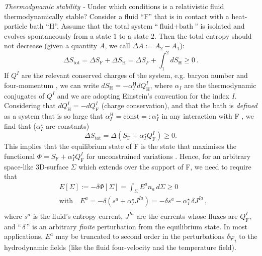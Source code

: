 \documentclass[aps,prl,reprint,nofootinbib]{revtex4-1}
\begin{document}
\textit{Thermodynamic stability -} Under which conditions is a relativistic fluid thermodynamically stable? Consider a fluid ``F'' that is in contact with a heat-particle bath ``H''. Assume that the total system ``$\text{fluid}+\text{bath}$'' is isolated and evolves spontaneously from a state $1$ to a state $2$. Then the total entropy should not decrease (given a quantity $A$, we call $\Delta A:= A_2-A_1$):
\begin{equation}
\Delta S_{\text{tot}}=\Delta S_\text{F} + \Delta S_\text{H} = \Delta S_F + \int_1^2 dS_\text{H}  \geq 0 \, .
\end{equation}
If $Q^I$ are the relevant conserved charges of the system, e.g. baryon number and four-momentum \cite{Peskin_book}, we can write $dS_\text{H} =-\alpha_I^\text{H} dQ^I_\text{H}$, where $\alpha_I$ are the thermodynamic conjugates of $Q^I$ and we are adopting Einstein's convention for the index $I$. Considering that $dQ^I_\text{H} =-dQ^I_\text{F}$ (charge conservation), and that the bath is \textit{defined} as a system that is so large that $\alpha_I^\text{H}=\text{const}=:\alpha_I^\star$ in any interaction with F \cite{Pathria2011,Termo,GavassinoTermometri}, we find that ($\alpha_I^\star$ are constants)
\begin{equation}\label{dittuto}
\Delta S_{\text{tot}}= \Delta (S_\text{F} +\alpha_I^\star Q^I_\text{F}) \geq 0.
\end{equation}
This implies that the equilibrium state of F is the state that maximises the functional $\Phi=S_\text{F} +\alpha_I^\star Q^I_\text{F}$ for unconstrained variations \cite{Callen_book,landau5,Pathria2011,Stuekelberg1962,Termo,Israel_2009_inbook,
GavassinoTermometri,Ottinger1997}. Hence, for an arbitrary space-like 3D-surface $\Sigma$ which extends over the support of F, we need to require that
\begin{equation}\label{Esigma}
\begin{split}
& E[\Sigma]:= -\delta \Phi[\Sigma] = \int_{\Sigma}  E^a  n_a \, d \Sigma \geq 0 \\
& \text{with} \quad E^a =-\delta (s^a +\alpha^\star_I J^{Ia})=-\delta s^a -\alpha^\star_I \, \delta J^{Ia} \, , \\
\end{split}
\end{equation}
where $s^a$ is the fluid's entropy current, $J^{Ia}$ are the currents whose fluxes are $Q^I_\text{F}$, and ``$\, \delta \,$'' is an arbitrary \textit{finite} perturbation from the equilibrium state. In most applications, $E^a$ may be truncated to second order in the perturbations $\delta \varphi_i$ to the hydrodynamic fields (like the fluid four-velocity and the temperature field).
\end{document}
